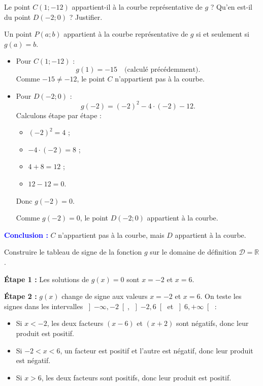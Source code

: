 \documentclass{exam}
\begin{document}
\begin{questions}
\question[1] Le point \(C(1 ; -12)\) appartient-il à la courbe représentative de \(g\) ? Qu'en est-il du point \(D(-2 ; 0)\) ? Justifier.

Un point \(P(a ; b)\) appartient à la courbe représentative de \(g\) si et seulement si \(g(a) = b\).

\begin{itemize}[noitemsep]
    \item Pour \(C(1 ; -12)\) :
    \[
    g(1) = -15 \quad \text{(calculé précédemment)}.
    \]
    Comme \(-15 \neq -12\), le point \(C\) n'appartient pas à la courbe.

    \item Pour \(D(-2 ; 0)\) :
    \[
    g(-2) = (-2)^2 - 4 \cdot (-2) - 12.
    \]
    Calculons étape par étape :
    \begin{itemize}[noitemsep]
        \item \((-2)^2 = 4\) ;
        \item \(-4 \cdot (-2) = 8\) ;
        \item \(4 + 8 = 12\) ;
        \item \(12 - 12 = 0\).
    \end{itemize}
    Donc \(g(-2) = 0\).

    Comme \(g(-2) = 0\), le point \(D(-2 ; 0)\) appartient à la courbe.
\end{itemize}

\textbf{\textcolor{blue}{Conclusion :}} \(C\) n'appartient pas à la courbe, mais \(D\) appartient à la courbe.

\question[2] Construire le tableau de signe de la fonction \(g\) sur le domaine de définition \(\mathcal{D} = \mathbb{R}\).

\textbf{Étape 1 :} Les solutions de \(g(x) = 0\) sont \(x = -2\) et \(x = 6\).

\textbf{Étape 2 :} \(g(x)\) change de signe aux valeurs \(x = -2\) et \(x = 6\). On teste les signes dans les intervalles \(\left]-\infty, -2\right[\), \(\left]-2, 6\right[\) et \(\left]6, +\infty\right[\) :
\begin{itemize}[noitemsep]
    \item Si \(x < -2\), les deux facteurs \((x - 6)\) et \((x + 2)\) sont négatifs, donc leur produit est positif.
    \item Si \(-2 < x < 6\), un facteur est positif et l'autre est négatif, donc leur produit est négatif.
    \item Si \(x > 6\), les deux facteurs sont positifs, donc leur produit est positif.
\end{itemize}


\end{questions}
\end{document}
